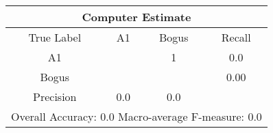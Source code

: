 \begin{tabular}{|c||c|c||c|}
\hline 
\multicolumn{4}{|c|}{Computer Estimate}\\
\hline 
True Label & A1 & Bogus & Recall \\
\hline 
A1 &  & 1 &  0.0\\
Bogus &  &  &  0.00\\
\hline 
Precision & 0.0 & 0.0 & \\
\hline 
\multicolumn{4}{|c|}{Overall Accuracy: 0.0 Macro-average F-measure: 0.0}\\
\hline 
\end{tabular} 
